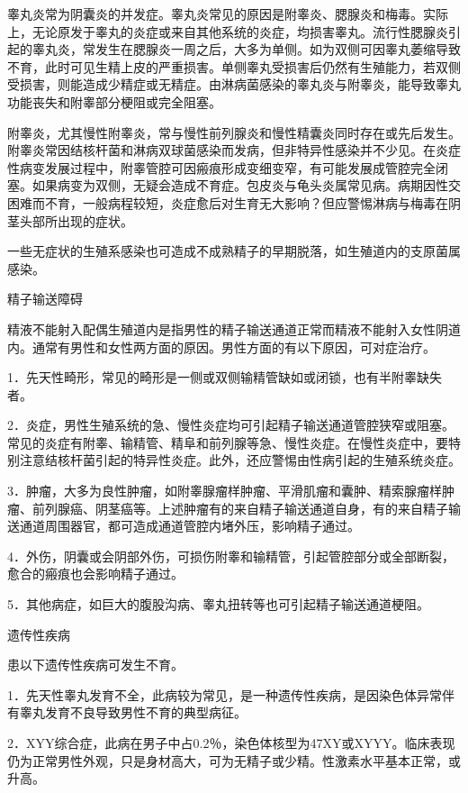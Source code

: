 \documentclass[12pt,UTF8,openany]{ctexbook}
\begin{document}
睾丸炎常为阴囊炎的并发症。睾丸炎常见的原因是附睾炎、腮腺炎和梅毒。实际上，无论原发于睾丸的炎症或来自其他系统的炎症，均损害睾丸。流行性腮腺炎引起的睾丸炎，常发生在腮腺炎一周之后，大多为单侧。如为双侧可因睾丸萎缩导致不育，此时可见生精上皮的严重损害。单侧睾丸受损害后仍然有生殖能力，若双侧受损害，则能造成少精症或无精症。由淋病菌感染的睾丸炎与附睾炎，能导致睾丸功能丧失和附睾部分梗阻或完全阻塞。

附睾炎，尤其慢性附睾炎，常与慢性前列腺炎和慢性精囊炎同时存在或先后发生。附睾炎常因结核杆菌和淋病双球菌感染而发病，但非特异性感染并不少见。在炎症性病变发展过程中，附睾管腔可因瘢痕形成变细变窄，有可能发展成管腔完全闭塞。如果病变为双侧，无疑会造成不育症。包皮炎与龟头炎属常见病。病期因性交困难而不育，一般病程较短，炎症愈后对生育无大影响？但应警惕淋病与梅毒在阴茎头部所出现的症状。

一些无症状的生殖系感染也可造成不成熟精子的早期脱落，如生殖道内的支原菌属感染。





精子输送障碍


精液不能射入配偶生殖道内是指男性的精子输送通道正常而精液不能射入女性阴道内。通常有男性和女性两方面的原因。男性方面的有以下原因，可对症治疗。

1．先天性畸形，常见的畸形是一侧或双侧输精管缺如或闭锁，也有半附睾缺失者。

2．炎症，男性生殖系统的急、慢性炎症均可引起精子输送通道管腔狭窄或阻塞。常见的炎症有附睾、输精管、精阜和前列腺等急、慢性炎症。在慢性炎症中，要特别注意结核杆菌引起的特异性炎症。此外，还应警惕由性病引起的生殖系统炎症。

3．肿瘤，大多为良性肿瘤，如附睾腺瘤样肿瘤、平滑肌瘤和囊肿、精索腺瘤样肿瘤、前列腺癌、阴茎癌等。上述肿瘤有的来自精子输送通道自身，有的来自精子输送通道周围器官，都可造成通道管腔内堵外压，影响精子通过。

4．外伤，阴囊或会阴部外伤，可损伤附睾和输精管，引起管腔部分或全部断裂，愈合的瘢痕也会影响精子通过。

5．其他病症，如巨大的腹股沟病、睾丸扭转等也可引起精子输送通道梗阻。





遗传性疾病


患以下遗传性疾病可发生不育。

1．先天性睾丸发育不全，此病较为常见，是一种遗传性疾病，是因染色体异常伴有睾丸发育不良导致男性不育的典型病征。

2．XYY综合症，此病在男子中占0.2％，染色体核型为47XY或XYYY。临床表现仍为正常男性外观，只是身材高大，可为无精子或少精。性激素水平基本正常，或升高。
\end{document}

